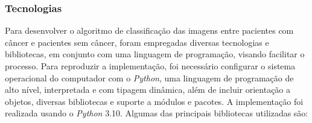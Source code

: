 
\subsubsection{\esp Tecnologias} \label{techs}
Para desenvolver o algoritmo de classificação das imagens entre pacientes com câncer e pacientes sem câncer, foram empregadas diversas tecnologias e bibliotecas, em conjunto com uma linguagem de programação, visando facilitar o processo. Para reproduzir a implementação, foi necessário configurar o sistema operacional do computador com o \textit{Python}, uma linguagem de programação de alto nível, interpretada e com tipagem dinâmica, além de incluir orientação a objetos, diversas bibliotecas e suporte a módulos e pacotes. A implementação foi realizada usando o \textit{Python} 3.10. Algumas das principais bibliotecas utilizadas são:


